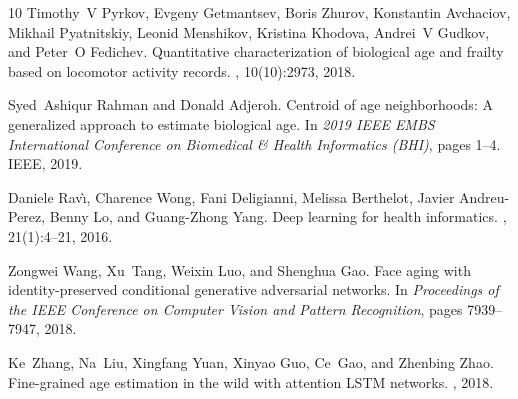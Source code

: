 \documentclass[unnumsec,webpdf,modern,large]{oup-authoring-template}%
\theoremstyle{thmstyleone}%
\theoremstyle{thmstyletwo}%
\theoremstyle{thmstylethree}%
\begin{document}
\begin{thebibliography}{10}
Timothy~V Pyrkov, Evgeny Getmantsev, Boris Zhurov, Konstantin Avchaciov, Mikhail Pyatnitskiy, Leonid Menshikov, Kristina Khodova, Andrei~V Gudkov, and Peter~O Fedichev.
\newblock Quantitative characterization of biological age and frailty based on locomotor activity records.
, 10(10):2973, 2018.

Syed~Ashiqur Rahman and Donald Adjeroh.
\newblock Centroid of age neighborhoods: A generalized approach to estimate biological age.
\newblock In {\em 2019 IEEE EMBS International Conference on Biomedical \& Health Informatics (BHI)}, pages 1--4. IEEE, 2019.

Daniele Rav{\`\i}, Charence Wong, Fani Deligianni, Melissa Berthelot, Javier Andreu-Perez, Benny Lo, and Guang-Zhong Yang.
\newblock Deep learning for health informatics.
, 21(1):4--21, 2016.

Zongwei Wang, Xu~Tang, Weixin Luo, and Shenghua Gao.
\newblock Face aging with identity-preserved conditional generative adversarial networks.
\newblock In {\em Proceedings of the IEEE Conference on Computer Vision and Pattern Recognition}, pages 7939--7947, 2018.

Ke~Zhang, Na~Liu, Xingfang Yuan, Xinyao Guo, Ce~Gao, and Zhenbing Zhao.
\newblock Fine-grained age estimation in the wild with attention {LSTM} networks.
, 2018.

\end{thebibliography}
\end{document}
